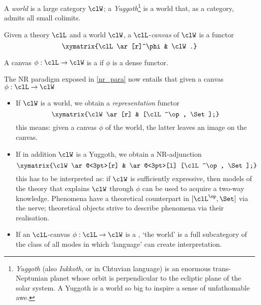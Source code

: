 \begin{definition}\label{mondo_yalda}
	A \emph{world} is a large category $\clW$; a \emph{Yuggoth}\footnote{\emph{Yuggoth} (also \emph{Iukkoth}, or {\yugg} in Chtuvian language) is an enormous trans-Neptunian planet whose orbit is perpendicular to the ecliptic plane of the solar system. A Yuggoth is a world so big to inspire a sense of unfathomable awe.} is a world that, as a category, admits all small colimits.
\end{definition}
\begin{definition}\label{canvas_scienza}
	Given a theory $\clL$ and a world $\clW$, a $\clL$-\emph{canvas} of $\clW$ is a functor
	\[\xymatrix{\clL \ar[r]^\phi & \clW.}\]
	
	A canvas $\phi : \clL \to \clW$ is a \emph{\science} if $\phi$ is a dense functor.
\end{definition}
	\begin{remark}\label{remark_yuggoth_1}
	The NR paradigm exposed in \autoref{nr_para} now entails that given a canvas $\phi : \clL \to \clW$
	\begin{itemize}
		\item If $\clW$ is a world, we obtain a \emph{representation} functor
		      \[ \xymatrix{\clW \ar[r] & [\clL^\op, \Set];} \label{mvndvs}\]
		      this means: given a canvas $\phi$ of the world, the latter leaves an image on the canvas.
		\item If in addition $\clW$ is a Yuggoth, we obtain a NR-adjunction
		      \[\xymatrix{\clW \ar@<3pt>[r] & \ar@<3pt>[l] [\clL^\op, \Set];}\]
		      this has to be interpreted as: if $\clW$ is sufficiently expressive, then models of the theory that explains $\clW$ through $\phi$ can be used to acquire a two-way knowledge. Phenomena have a theoretical counterpart in $[\clL^\op,\Set]$ via the nerve; theoretical objects strive to describe phenomena via their realisation.
		\item If an $\clL$-canvas $\phi : \clL \to \clW$ is a \science, `the world' is a full subcategory of the class of all modes in which `language' can create interpretation.
	\end{itemize}
\end{remark}
